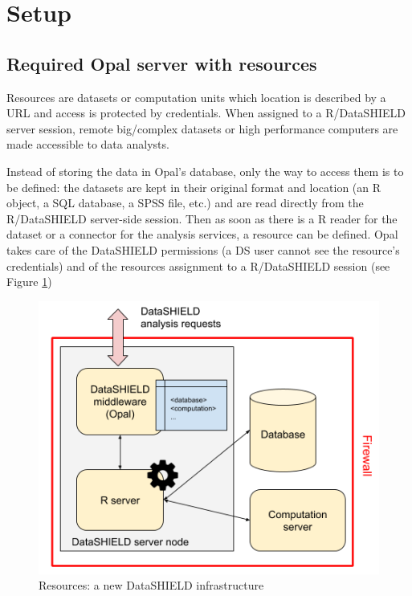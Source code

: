 \documentclass[]{article}
\begin{document}
\hypertarget{setup}{%
\section{Setup}\label{setup}}

\hypertarget{required-opal-server-with-resources}{%
\subsection{Required Opal server with
resources}\label{required-opal-server-with-resources}}

Resources are datasets or computation units which location is described
by a URL and access is protected by credentials. When assigned to a
R/DataSHIELD server session, remote big/complex datasets or high
performance computers are made accessible to data analysts.

Instead of storing the data in Opal's database, only the way to access
them is to be defined: the datasets are kept in their original format
and location (an R object, a SQL database, a SPSS file, etc.) and are
read directly from the R/DataSHIELD server-side session. Then as soon as
there is a R reader for the dataset or a connector for the analysis
services, a resource can be defined. Opal takes care of the DataSHIELD
permissions (a DS user cannot see the resource's credentials) and of the
resources assignment to a R/DataSHIELD session (see Figure
\ref{fig:resources})

\begin{figure}

{\centering \includegraphics[width=0.9\linewidth]{fig/resourcer_fig} 

}

\caption{Resources: a new DataSHIELD infrastructure}\label{fig:resources}
\end{figure}
\end{document}
